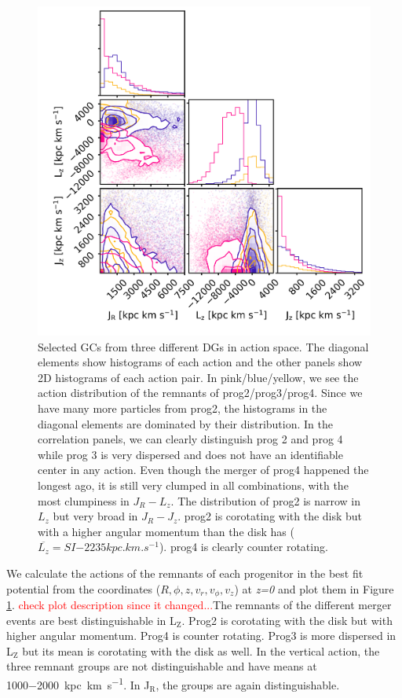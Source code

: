 \begin{figure}[htbp]
\captionsetup{format=plain}
    \centering
    \includegraphics[width=1.0\textwidth]{plots/Dynamics/prog234_GCwodisk_actions_snap_127.png}
    \caption{Selected \acp{GC} from three different \acp{DG} in action space. The diagonal elements show histograms of each action and the other panels show 2D histograms of each action pair. In pink/blue/yellow, we see the action distribution of the remnants of prog2/prog3/prog4. Since we have many more particles from prog2, the histograms in the diagonal elements are dominated by their distribution. In the correlation panels, we can clearly distinguish prog 2 and prog 4 while prog 3 is very dispersed and does not have an identifiable center in any action. Even though the merger of prog4 happened the longest ago, it is still very clumped in all combinations, with the most clumpiness in $J_R - L_z$. The distribution of prog2 is narrow in $L_z$ but very broad in $J_R - J_z$. prog2 is corotating with the disk but with a higher angular momentum than the disk has (\(\overline{L_z} = SI{-2235}{kpc.km.s^{-1}}\)). prog4 is clearly counter rotating.}
    \label{fig:act_all_merg_best_pot}
\end{figure}
We calculate the actions of the remnants of each progenitor in the best fit potential from the coordinates ($R, \phi, z, v_r, v_\phi, v_z$) at \textit{z=0} and plot them in Figure \ref{fig:act_all_merg_best_pot}. \textcolor{red}{check plot description since it changed...}The remnants of the different merger events are best distinguishable in L$_\mathrm{Z}$. Prog2 is corotating with the disk but with higher angular momentum. Prog4 is counter rotating. Prog3 is more dispersed in L$_\mathrm{Z}$ but its mean is corotating with the disk as well. In the vertical action, the three remnant groups are not distinguishable and have means at \SI{1000-2000}{kpc.km.s^{-1}}. In J$_\mathrm{R}$, the groups are again distinguishable. 
